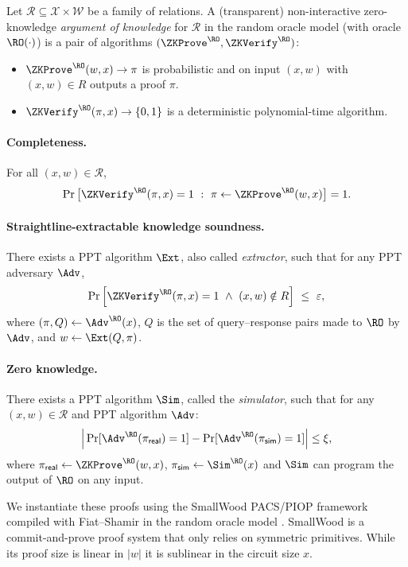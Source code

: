 \begin{definition}\label{def:nizk-ark}
Let $\mathcal{R}\subseteq \mathcal{X}\times \mathcal{W}$  be a family of relations.
A (transparent) non-interactive zero-knowledge \emph{argument of knowledge} for $\mathcal{R}$ in the random oracle model
(with oracle $\RO(\cdot)$) is a pair of algorithms $(\ZKProve^{\RO},\ZKVerify^{\RO})$:
\begin{itemize}[leftmargin=1.25em]
  \item $\ZKProve^{\RO}(w ,x)\to \pi$ is probabilistic and on input $(x,w)$ with
  $(x,w)\in R$ outputs a proof $\pi$.
  \item $\ZKVerify^{\RO}(\pi,x)\to \{0,1\}$ is a deterministic polynomial-time algorithm.
\end{itemize}

\paragraph{Completeness.}
For all $(x,w)\in\mathcal{R}$,
\[
  \Pr\big[\ZKVerify^{\RO}(\pi,x)=1 \ :\ \pi\gets \ZKProve^{\RO}(w,x)\big]=1.
\]

\paragraph{Straightline-extractable knowledge soundness.} 
There exists a PPT algorithm $\Ext$, also called \emph{extractor}, such that for any PPT adversary $\Adv$,
\[
  \Pr\Big[
    \ZKVerify^{\RO}(\pi,x)=1 \ \wedge\ (x,w)\notin R
  \Big]\ \le\ \varepsilon,
\]
where $(\pi,Q)\leftarrow \Adv^{\RO}(x)$, $Q$ is the set of query--response pairs made to $\RO$ by $\Adv$,
and $w\leftarrow \Ext(Q,\pi)$.

\paragraph{Zero knowledge.}
There exists a PPT algorithm $\Sim$, called the \emph{simulator}, such that for any $(x,w)\in \mathcal{R}$ and PPT algorithm $\Adv$:
\[
  \Big|\Pr[\Adv^{\RO}(\pi_{\mathsf{real}})=1]-\Pr[\Adv^{\RO}(\pi_{\mathsf{sim}})=1]\Big|
  \le \xi,
\]
where $\pi_{\mathsf{real}}\gets \ZKProve^{\RO}(w ,x)$,  $\pi_{\mathsf{sim}}\gets \Sim^{\RO}(x)$ and $\Sim$ can program the output of $\RO$ on any input.
\end{definition}

We instantiate these proofs using the SmallWood PACS/PIOP framework compiled with Fiat--Shamir in the random oracle
model \cite{EPRINT:FenRiv25b}. SmallWood is a commit-and-prove proof system that only relies on symmetric primitives. While its proof size is linear in $|w|$ it is sublinear in the circuit size $x$.

